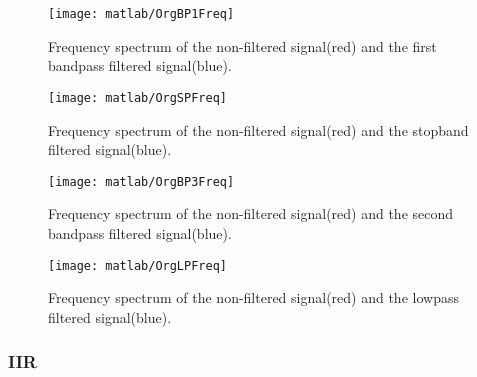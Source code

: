 \begin{figure}[!htb]
	\centering
	\texttt{[image: matlab/OrgBP1Freq]}
	\caption{Frequency spectrum of the non-filtered signal(red) and the first bandpass filtered signal(blue).}
	\label{fig:FIR_bandpass1}
\end{figure}

\begin{figure}[!htb]
	\centering
	\texttt{[image: matlab/OrgSPFreq]}
	\caption{Frequency spectrum of the non-filtered signal(red) and the stopband filtered signal(blue).}
	\label{fig:FIR_stopband}
\end{figure}

\begin{figure}[!htb]
	\centering
	\texttt{[image: matlab/OrgBP3Freq]}
	\caption{Frequency spectrum of the non-filtered signal(red) and the second bandpass filtered signal(blue).}
	\label{fig:FIR_bandpass2}
\end{figure}

\begin{figure}[!htb]
	\centering
	\texttt{[image: matlab/OrgLPFreq]}
	\caption{Frequency spectrum of the non-filtered signal(red) and the lowpass filtered signal(blue).}
	\label{fig:FIR_lowpass}
\end{figure}

\subsubsection{IIR}


